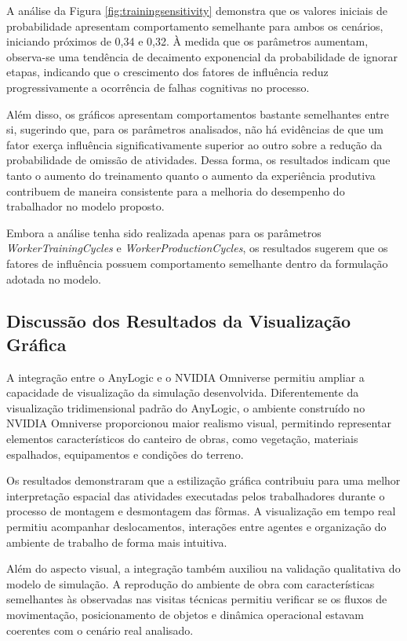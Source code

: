 A análise da Figura \ref{fig:trainingsensitivity} demonstra que os valores iniciais de probabilidade apresentam comportamento semelhante para ambos os cenários, iniciando próximos de 0,34 e 0,32. À medida que os parâmetros aumentam, observa-se uma tendência de decaimento exponencial da probabilidade de ignorar etapas, indicando que o crescimento dos fatores de influência reduz progressivamente a ocorrência de falhas cognitivas no processo.

Além disso, os gráficos apresentam comportamentos bastante semelhantes entre si, sugerindo que, para os parâmetros analisados, não há evidências de que um fator exerça influência significativamente superior ao outro sobre a redução da probabilidade de omissão de atividades. Dessa forma, os resultados indicam que tanto o aumento do treinamento quanto o aumento da experiência produtiva contribuem de maneira consistente para a melhoria do desempenho do trabalhador no modelo proposto.

Embora a análise tenha sido realizada apenas para os parâmetros \textit{WorkerTrainingCycles} e \textit{WorkerProductionCycles}, os resultados sugerem que os fatores de influência possuem comportamento semelhante dentro da formulação adotada no modelo.

\subsection{Discussão dos Resultados da Visualização Gráfica}

A integração entre o AnyLogic e o NVIDIA Omniverse permitiu ampliar a capacidade de visualização da simulação desenvolvida. Diferentemente da visualização tridimensional padrão do AnyLogic, o ambiente construído no NVIDIA Omniverse proporcionou maior realismo visual, permitindo representar elementos característicos do canteiro de obras, como vegetação, materiais espalhados, equipamentos e condições do terreno.

Os resultados demonstraram que a estilização gráfica contribuiu para uma melhor interpretação espacial das atividades executadas pelos trabalhadores durante o processo de montagem e desmontagem das fôrmas. A visualização em tempo real permitiu acompanhar deslocamentos, interações entre agentes e organização do ambiente de trabalho de forma mais intuitiva.

Além do aspecto visual, a integração também auxiliou na validação qualitativa do modelo de simulação. A reprodução do ambiente de obra com características semelhantes às observadas nas visitas técnicas permitiu verificar se os fluxos de movimentação, posicionamento de objetos e dinâmica operacional estavam coerentes com o cenário real analisado.

